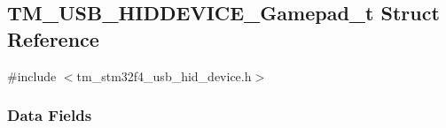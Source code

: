 \hypertarget{struct_t_m___u_s_b___h_i_d_d_e_v_i_c_e___gamepad__t}{}\subsection{T\+M\+\_\+\+U\+S\+B\+\_\+\+H\+I\+D\+D\+E\+V\+I\+C\+E\+\_\+\+Gamepad\+\_\+t Struct Reference}
\label{struct_t_m___u_s_b___h_i_d_d_e_v_i_c_e___gamepad__t}


{\ttfamily \#include $<$tm\+\_\+stm32f4\+\_\+usb\+\_\+hid\+\_\+device.\+h$>$}

\subsubsection*{Data Fields}
